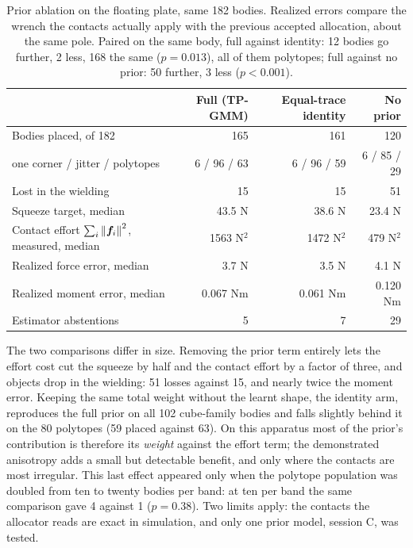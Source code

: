 \begin{table}[htbp]\centering\small
\begin{tabular}{@{}lrrr@{}}\toprule
 & Full (TP-GMM) & Equal-trace identity & No prior\\
\midrule
Bodies placed, of 182 & 165 & 161 & 120\\
\quad one corner / jitter / polytopes & 6 / 96 / 63 & 6 / 96 / 59 & 6 / 85 / 29\\
Lost in the wielding & 15 & 15 & 51\\
Squeeze target, median & 43.5 N & 38.6 N & 23.4 N\\
Contact effort $\sum_i\left\lVert\bm{f}_i\right\rVert^2$, measured, median & 1563 N$^2$ & 1472 N$^2$ & 479 N$^2$\\
Realized force error, median & 3.7 N & 3.5 N & 4.1 N\\
Realized moment error, median & 0.067 Nm & 0.061 Nm & 0.120 Nm\\
Estimator abstentions & 5 & 7 & 29\\
\bottomrule\end{tabular}
\caption{Prior ablation on the floating plate, same 182 bodies. Realized errors compare the wrench the contacts actually apply with the previous accepted allocation, about the same pole. Paired on the same body, full against identity: 12 bodies go further, 2 less, 168 the same ($p=0.013$), all of them polytopes; full against no prior: 50 further, 3 less ($p<0.001$).}
\label{tab:prior-ablation}
\end{table}

The two comparisons differ in size. Removing the prior term entirely lets the effort cost cut the squeeze by half and the contact effort by a factor of three, and objects drop in the wielding: 51 losses against 15, and nearly twice the moment error. Keeping the same total weight without the learnt shape, the identity arm, reproduces the full prior on all 102 cube-family bodies and falls slightly behind it on the 80 polytopes (59 placed against 63). On this apparatus most of the prior's contribution is therefore its \emph{weight} against the effort term; the demonstrated anisotropy adds a small but detectable benefit, and only where the contacts are most irregular. This last effect appeared only when the polytope population was doubled from ten to twenty bodies per band: at ten per band the same comparison gave 4 against 1 ($p=0.38$). Two limits apply: the contacts the allocator reads are exact in simulation, and only one prior model, session C, was tested.

